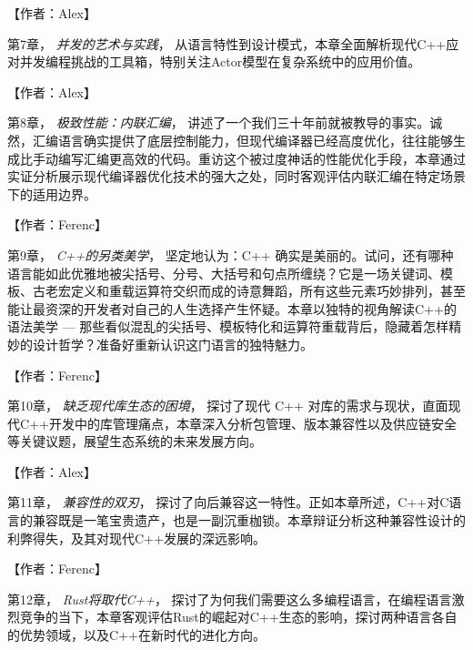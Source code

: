 【作者：Alex】

\hspace*{\fill}

第7章， \textit{并发的艺术与实践}， 从语言特性到设计模式，本章全面解析现代C++应对并发编程挑战的工具箱，特别关注Actor模型在复杂系统中的应用价值。

【作者：Alex】

\hspace*{\fill}

第8章， \textit{极致性能：内联汇编}， 讲述了一个我们三十年前就被教导的事实。诚然，汇编语言确实提供了底层控制能力，但现代编译器已经高度优化，往往能够生成比手动编写汇编更高效的代码。重访这个被过度神话的性能优化手段，本章通过实证分析展示现代编译器优化技术的强大之处，同时客观评估内联汇编在特定场景下的适用边界。

【作者：Ferenc】

\hspace*{\fill}

第9章， \textit{C++的另类美学}， 坚定地认为：C++ 确实是美丽的。试问，还有哪种语言能如此优雅地被尖括号、分号、大括号和句点所缠绕？它是一场关键词、模板、古老宏定义和重载运算符交织而成的诗意舞蹈，所有这些元素巧妙排列，甚至能让最资深的开发者对自己的人生选择产生怀疑。本章以独特的视角解读C++的语法美学 --- 那些看似混乱的尖括号、模板特化和运算符重载背后，隐藏着怎样精妙的设计哲学？准备好重新认识这门语言的独特魅力。

【作者：Ferenc】

\hspace*{\fill}

第10章， \textit{缺乏现代库生态的困境}， 探讨了现代 C++ 对库的需求与现状，直面现代C++开发中的库管理痛点，本章深入分析包管理、版本兼容性以及供应链安全等关键议题，展望生态系统的未来发展方向。

【作者：Alex】

\hspace*{\fill}

第11章， \textit{兼容性的双刃}， 探讨了向后兼容这一特性。正如本章所述，C++对C语言的兼容既是一笔宝贵遗产，也是一副沉重枷锁。本章辩证分析这种兼容性设计的利弊得失，及其对现代C++发展的深远影响。

【作者：Ferenc】

\hspace*{\fill}

第12章， \textit{Rust将取代C++}， 探讨了为何我们需要这么多编程语言，在编程语言激烈竞争的当下，本章客观评估Rust的崛起对C++生态的影响，探讨两种语言各自的优势领域，以及C++在新时代的进化方向。

